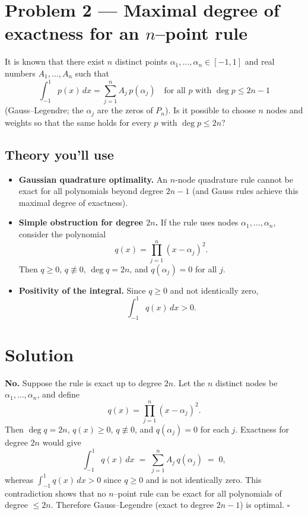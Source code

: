 \documentclass[12pt,a4paper]{article}
\newcommand{\qed}{\hfill$\square$}
\theoremstyle{plain}
\theoremstyle{definition}
\theoremstyle{remark}
\theoremstyle{remark}
\begin{document}
	
	
	\section*{Problem 2 — Maximal degree of exactness for an $n$–point rule}
	
	It is known that there exist $n$ distinct points $\alpha_1,\dots,\alpha_n\in[-1,1]$ and real numbers
	$A_1,\dots,A_n$ such that
	\[
	\int_{-1}^{1} p(x)\,dx=\sum_{j=1}^n A_j\,p(\alpha_j)
	\quad\text{for all } p \text{ with } \deg p\le 2n-1
	\]
	(Gauss–Legendre; the $\alpha_j$ are the zeros of $P_n$).  
	Is it possible to choose $n$ nodes and weights so that the same holds for every $p$ with $\deg p\le 2n$?
	
	\smallskip
	
	\subsection*{Theory you’ll use}
	
	\begin{itemize}\setlength{\itemsep}{1em}
		
		\item \textbf{Gaussian quadrature optimality.}  
		An $n$-node quadrature rule cannot be exact for all polynomials beyond degree $2n-1$  
		(and Gauss rules achieve this maximal degree of exactness).
		
		\item \textbf{Simple obstruction for degree $2n$.}  
		If the rule uses nodes $\alpha_1,\dots,\alpha_n$, consider the polynomial
		\[
		q(x)=\prod_{j=1}^{n}(x-\alpha_j)^2 .
		\]
		Then $q\ge 0$, $q\not\equiv 0$, $\deg q=2n$, and $q(\alpha_j)=0$ for all $j$.
		
		\item \textbf{Positivity of the integral.}  
		Since $q\ge 0$ and not identically zero,
		\[
		\int_{-1}^{1} q(x)\,dx > 0 .
		\]
		
	\end{itemize}
	
	
	\section*{Solution}
	\textbf{No.} Suppose the rule is exact up to degree $2n$. Let the $n$ distinct nodes be $\alpha_1,\dots,\alpha_n$,
	and define
	\[
	q(x)=\prod_{j=1}^n (x-\alpha_j)^2 .
	\]
	Then $\deg q=2n$, $q(x)\ge 0$, $q\not\equiv 0$, and $q(\alpha_j)=0$ for each $j$.
	Exactness for degree $2n$ would give
	\[
	\int_{-1}^{1} q(x)\,dx \;=\; \sum_{j=1}^n A_j\,q(\alpha_j) \;=\; 0,
	\]
	whereas $\int_{-1}^{1} q(x)\,dx>0$ since $q\ge 0$ and is not identically zero. This contradiction shows
	that no $n$–point rule can be exact for all polynomials of degree $\le 2n$.
	Therefore Gauss–Legendre (exact to degree $2n-1$) is optimal. \qed
	
\end{document}
